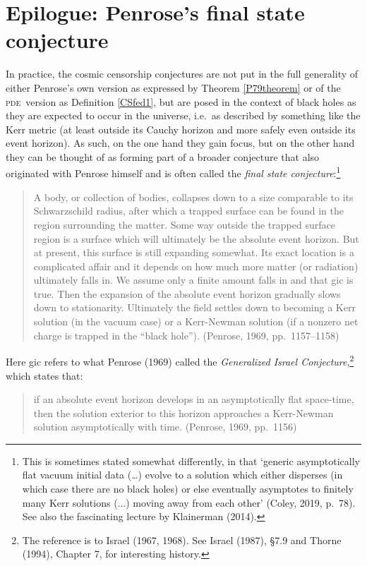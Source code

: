 \documentclass[12pt]{article}
\newcommand{\pde}{\textsc{pde}}
\begin{document}
\section{Epilogue: Penrose's final state conjecture}\label{FSC}
In practice, the cosmic censorship conjectures are not put in the full  generality of either Penrose's own version as expressed by Theorem \ref{P79theorem} or of the \pde\ version as Definition \ref{CSfed1}, 
but are posed in the context of black holes as they are expected to occur in the universe, i.e.\ as described by something like the Kerr metric (at least outside its Cauchy horizon and more safely even outside its event horizon). As such, on the one hand
 they gain focus, but on the other hand they can be thought of as
 forming part of a broader  conjecture that also originated with Penrose himself and is often called the \emph{final state conjecture}:\footnote{This is sometimes stated somewhat differently, in that `generic asymptotically  flat vacuum initial data (\ldots) evolve to a solution which either disperses (in which case there are no black holes) or else eventually asymptotes to
  finitely many Kerr solutions (...) moving away from each other' (Coley, 2019, p.\ 78). See also the fascinating lecture by Klainerman (2014).
  }
 \begin{quote}
\begin{small}A body, or collection of bodies, collapses down to a size comparable to its Schwarzschild radius, after which a trapped surface can be found in the region surrounding the matter. Some way outside the trapped surface region is a surface which will ultimately be the absolute event horizon. But at present, this surface is still expanding somewhat. Its exact location is a complicated affair and it depends on how much more matter (or radiation) ultimately falls in. We assume only a finite amount falls in and that {\sc gic} is true. Then the expansion of the absolute event horizon gradually slows down to stationarity. Ultimately the field settles down to becoming a Kerr solution (in
the vacuum case) or a Kerr-Newman solution (if a nonzero net charge is trapped in the ``black hole''). (Penrose, 1969, pp.\ 1157--1158)
\end{small}
\end{quote}
Here {\sc gic} refers to what Penrose (1969) called the \emph{Generalized Israel Conjecture},\footnote{The reference is to Israel (1967, 1968). See Israel (1987), \S 7.9 and Thorne (1994), Chapter 7, for interesting history.}
which states that:
 \begin{quote}
\begin{small}
 if an absolute event horizon develops in an asymptotically flat space-time, then the solution exterior to this horizon approaches a Kerr-Newman solution asymptotically with time. (Penrose, 1969, pp.\ 1156)
\end{small}
\end{quote}
\end{document}

